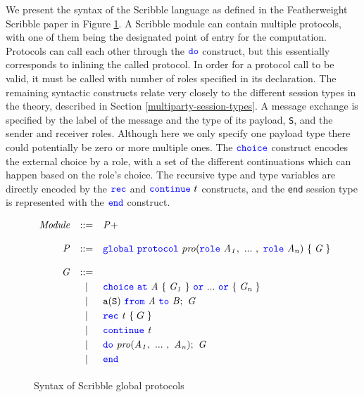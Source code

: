 \documentclass[12pt,twoside]{report}
\newcommand{\white}{\ \ \ \ \ \ \ \ \ \ \ \ }
\begin{document}
We present the syntax of the Scribble language as defined in the Featherweight Scribble paper\cite{featherweight} in Figure \ref{scribble-global-protocol}. A Scribble module can contain multiple protocols, with one of them being the designated point of entry for the computation. Protocols can call each other through the ${\color{blue}\mathtt{do}}$ construct, but this essentially corresponds to inlining the called protocol. In order for a protocol call to be valid, it must be called with number of roles specified in its declaration. The remaining syntactic constructs relate very closely to the different session types in the theory, described in Section \ref{multiparty-session-types}. A message exchange is specified by the label of the message and the type of its payload, \texttt{S}, and the sender and receiver roles. Although here we only specify one payload type there could potentially be zero or more multiple ones. The ${\color{blue}\mathtt{choice}}$ construct encodes the external choice by a role, with a set of the different continuations which can happen based on the role's choice. The recursive type and type variables are directly encoded by the ${\color{blue}\mathtt{rec}}$ and ${\color{blue}\mathtt{continue}}\ t$ constructs, and the \texttt{end} session type is represented with the ${\color{blue}\mathtt{end}}$ construct.\\



\begin{figure}[!h]
    \centering
    \begin{math}
        \begin{array}{rcl}
            \mathit{Module} & ::= & \mathit{P}+\\\\
            \mathit{P} & ::= & {\color{blue}\mathtt{global}}\ {\color{blue}\mathtt{protocol}}\ \mathit{pro}({\color{blue}\mathtt{role}}\ \mathit{A_1},\ ...\ ,\ {\color{blue}\mathtt{role}}\ \mathit{A_n})\ \{\;\mathit{G}\;\} \\\\
            \mathit{G} & ::= &\\[2.75pt]
              &   | & {\color{blue}\mathtt{choice}}\ {\color{blue}\mathtt{at}}\ \mathit{A}\ \{\;\mathit{G_1}\;\}\ {\color{blue}\mathtt{or}}\ ...\ {\color{blue}\mathtt{or}}\ \{\;\mathit{G_n}\;\} \\[2.75pt]
              &   | & \mathtt{a}(\mathtt{S})\ {\color{blue}\mathtt{from}}\ \mathit{A}\ {\color{blue}\mathtt{to}}\ \mathit{B};\ \mathit{G} \\[2.75pt]
              &   | & {\color{blue}\mathtt{rec}}\ \mathit{t}\ \{\;G\;\} \\[2.75pt]
              &   | &  {\color{blue}\mathtt{continue}}\ \mathit{t} \\[2.75pt]
              &   | & {\color{blue}\mathtt{do}}\ \mathit{pro}(\mathit{A_1},\ ...\ ,\ \mathit{A_n});\ \mathit{G} \\[2.75pt]
              &   | & {\color{blue}\mathtt{end}} \\[2.75pt]
        \end{array}
    \end{math}
    \caption{Syntax of Scribble global protocols}
    \label{scribble-global-protocol}
\end{figure}
\end{document}

